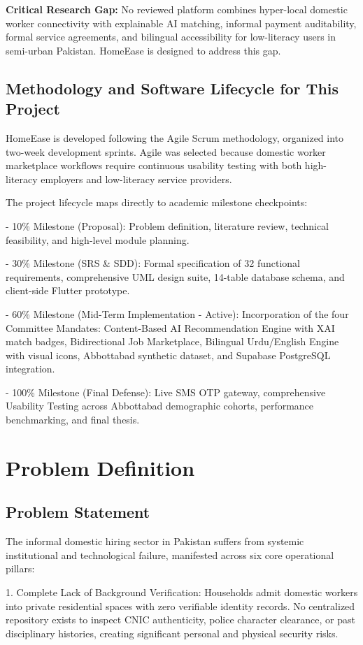 \documentclass[12pt,a4paper]{article}
\begin{document}
\textbf{Critical Research Gap:} No reviewed platform combines hyper-local domestic worker connectivity with explainable AI matching, informal payment auditability, formal service agreements, and bilingual accessibility for low-literacy users in semi-urban Pakistan. HomeEase is designed to address this gap.

\subsection{Methodology and Software Lifecycle for This Project}
HomeEase is developed following the Agile Scrum methodology, organized into two-week development sprints. Agile was selected because domestic worker marketplace workflows require continuous usability testing with both high-literacy employers and low-literacy service providers.

The project lifecycle maps directly to academic milestone checkpoints:

- 10\% Milestone (Proposal): Problem definition, literature review, technical feasibility, and high-level module planning.

- 30\% Milestone (SRS \& SDD): Formal specification of 32 functional requirements, comprehensive UML design suite, 14-table database schema, and client-side Flutter prototype.

- 60\% Milestone (Mid-Term Implementation - Active): Incorporation of the four Committee Mandates: Content-Based AI Recommendation Engine with XAI match badges, Bidirectional Job Marketplace, Bilingual Urdu/English Engine with visual icons, Abbottabad synthetic dataset, and Supabase PostgreSQL integration.

- 100\% Milestone (Final Defense): Live SMS OTP gateway, comprehensive Usability Testing across Abbottabad demographic cohorts, performance benchmarking, and final thesis.

\section{Problem Definition}
\subsection{Problem Statement}
The informal domestic hiring sector in Pakistan suffers from systemic institutional and technological failure, manifested across six core operational pillars:

1. Complete Lack of Background Verification: Households admit domestic workers into private residential spaces with zero verifiable identity records. No centralized repository exists to inspect CNIC authenticity, police character clearance, or past disciplinary histories, creating significant personal and physical security risks.
\end{document}
